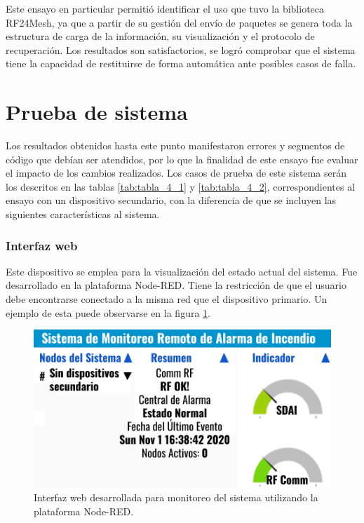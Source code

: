 Este ensayo en particular permitió identificar el uso que tuvo la biblioteca RF24Mesh, ya que a partir de su gestión del envío de paquetes se genera toda la estructura de carga de la información, su visualización y el protocolo de recuperación. Los resultados son satisfactorios, se logró comprobar que el sistema tiene la capacidad de restituirse de forma automática ante posibles casos de falla.


\section{Prueba de sistema}

Los resultados obtenidos hasta este punto manifestaron errores y segmentos de código que debían ser atendidos, por lo que la finalidad de este ensayo fue evaluar el impacto de los cambios realizados. Los casos de prueba de este sistema serán los descritos en las tablas \ref{tab:tabla_4_1} y \ref{tab:tabla_4_2}, correspondientes al ensayo con un dispositivo secundario, con la diferencia de que se incluyen las siguientes características al sistema. 

\subsubsection{Interfaz web}
Este dispositivo se emplea para la visualización del estado actual del sistema. Fue desarrollado en la plataforma Node-RED. Tiene la restricción de que el usuario debe encontrarse conectado a la misma red que el dispositivo primario. Un ejemplo de esta puede observarse en la figura \ref{fig:figura_m}.


\begin{figure}[ht]
	\centering
	\includegraphics[scale=.55]{./Figures/Capitulo4/Figura_M.png}
	\caption{Interfaz web desarrollada para monitoreo del sistema utilizando la plataforma Node-RED.}
	\label{fig:figura_m}
\end{figure}

